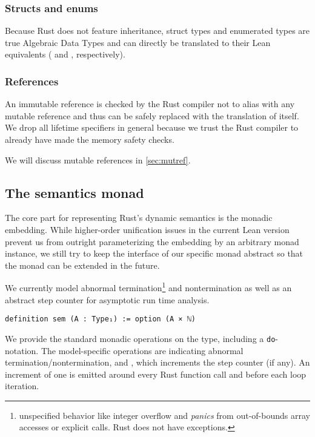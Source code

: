 \subsubsection{Structs and enums}

Because Rust does not feature inheritance, struct types and enumerated types are
true Algebraic Data Types and can directly be translated to their Lean
equivalents ( and , respectively).

\subsubsection{References}

An immutable reference  is checked by the Rust compiler not to alias
with any mutable reference and thus can be safely replaced with the translation
of  itself. We drop all lifetime specifiers in general because we trust
the Rust compiler to already have made the memory safety checks.

We will discuss mutable references in \autoref{sec:mutref}.

\subsection{The semantics monad}

The core part for representing Rust's dynamic semantics is the monadic embedding. While
higher-order unification issues in the current Lean version prevent us from
outright parameterizing the embedding by an arbitrary monad instance, we still
try to keep the interface of our specific monad abstract so that the monad can be
extended in the future.

We currently model abnormal termination\footnote{unspecified behavior like integer
overflow and \emph{panics} from out-of-bounds array accesses or explicit 
calls. Rust does not have exceptions.} and
nontermination as well as an abstract step counter for asymptotic run time analysis.

\begin{verbatim}
definition sem (A : Type₁) := option (A × ℕ)
\end{verbatim}

We provide the standard monadic operations on the type, including a
\texttt{do}-notation. The model-specific operations are 
indicating abnormal termination/nontermination, and , which
increments the step counter (if any). An increment of one is emitted around
every Rust function call and before each loop iteration.

